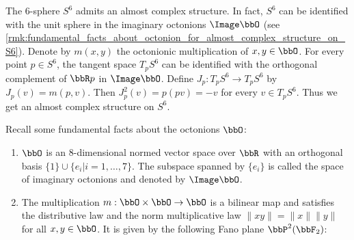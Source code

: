     \begin{example}\label{eg:almost_complex_structure_on_S6}
        The \(6\)-sphere \(S^6\) admits an almost complex structure.
        In fact, \(S^6\) can be identified with the unit sphere in the imaginary octonions \(\Image \bbO\) (see \cref{rmk:fundamental_facts_about_octonion_for_almost_complex_structure_on_S6}).
        Denote by \(m(x,y)\) the octonionic multiplication of \(x,y\in \bbO\).
        For every point \(p\in S^6\), the tangent space \(T_pS^6\) can be identified with the orthogonal complement of \(\bbR p\) in \(\Image \bbO\).
        Define \(J_p: T_pS^6 \to T_pS^6\) by \(J_p(v) = m(p,v)\).
        Then \(J_p^2(v) = p(pv) = -v\) for every \(v\in T_pS^6\).
        Thus we get an almost complex structure on \(S^6\).
    \end{example}
    \begin{remark}\label{rmk:fundamental_facts_about_octonion_for_almost_complex_structure_on_S6}
        Recall some fundamental facts about the octonions \(\bbO\):
        \begin{enumerate}
            \item \(\bbO\) is an \(8\)-dimensional normed vector space over \(\bbR\) with an orthogonal basis \(\{1\}\cup \{e_i|i=1,\ldots,7\}\).
                The subspace spanned by \(\{e_i\}\) is called the space of imaginary octonions and denoted by \(\Image \bbO\).
            \item The multiplication \(m: \bbO \times \bbO \to \bbO\) is a bilinear map and satisfies the distributive law and the norm multiplicative law \(\|xy\| = \|x\|\|y\|\) for all \(x,y\in \bbO\).
                It is given by the following Fano plane \(\bbP^2(\bbF_2)\):
                \begin{center}
                \usetikzlibrary{calc, decorations.markings}
\end{center}
\end{enumerate}
\end{remark}
